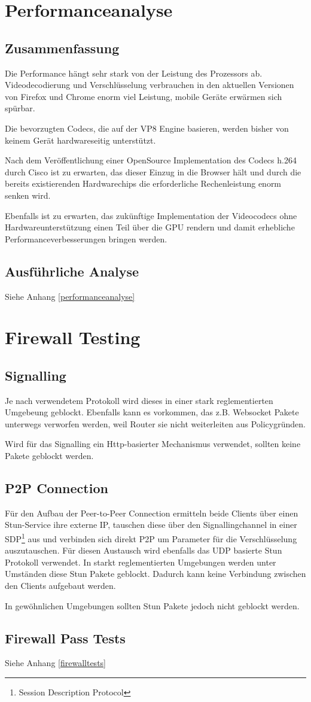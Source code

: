 \chapter{Performanceanalyse}
	\section{Zusammenfassung}
		Die Performance hängt sehr stark von der Leistung des Prozessors ab. Videodecodierung und Verschlüsselung verbrauchen in den aktuellen Versionen von Firefox und Chrome enorm viel Leistung, mobile Geräte erwärmen sich spürbar.
		
		Die bevorzugten Codecs, die auf der VP8 Engine basieren, werden bisher von keinem Gerät hardwareseitig unterstützt.
		
		Nach dem Veröffentlichung einer OpenSource Implementation des Codecs h.264 durch Cisco ist zu erwarten, das dieser Einzug in die Browser hält und durch die bereits existierenden Hardwarechips die erforderliche Rechenleistung enorm senken wird.
		
		Ebenfalls ist zu erwarten, das zukünftige Implementation der Videocodecs ohne Hardwareunterstützung einen Teil über die GPU rendern und damit erhebliche Performanceverbesserungen bringen werden.
		
	\section{Ausführliche Analyse}
		Siehe Anhang \ref{performanceanalyse}
	
	
\chapter{Firewall Testing}
	\section{Signalling}
		Je nach verwendetem Protokoll wird dieses in einer stark reglementierten Umgebeung geblockt. Ebenfalls kann es vorkommen, das z.B. Websocket Pakete unterwegs verworfen werden, weil Router sie nicht weiterleiten aus Policygründen.
		
		Wird für das Signalling ein Http-basierter Mechanismus verwendet, sollten keine Pakete geblockt werden.

	\section{P2P Connection}
		Für den Aufbau der Peer-to-Peer Connection ermitteln beide Clients über einen Stun-Service ihre externe IP, tauschen diese über den Signallingchannel in einer SDP\footnote{Session Description Protocol} aus und verbinden sich direkt P2P um Parameter für die Verschlüsselung auszutauschen. Für diesen Austausch wird ebenfalls das UDP basierte Stun Protokoll verwendet. 
		In starkt reglementierten Umgebungen werden unter Umständen diese Stun Pakete geblockt. Dadurch kann keine Verbindung zwischen den Clients aufgebaut werden.
		
		In gewöhnlichen Umgebungen sollten Stun Pakete jedoch nicht geblockt werden.
	
	\section{Firewall Pass Tests}
		Siehe Anhang \ref{firewalltests}